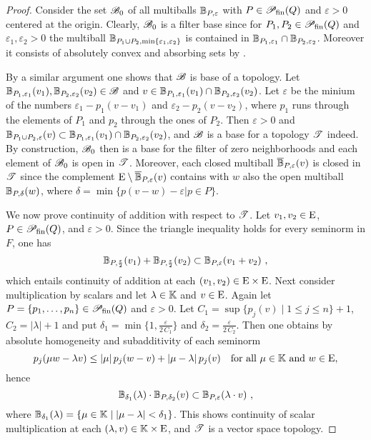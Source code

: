 \begin{proof}
  Consider the set $\mathscr{B}_0$ of all multiballs $\mathbb{B}_{P,\varepsilon}$ with
  $P  \in \mathscr{P}_\textup{fin}(Q)$ and $\varepsilon >0 $ centered at the origin.
  Clearly, $\mathscr{B}_0$ is a filter base since for $P_1,P_2  \in \mathscr{P}_\textup{fin}(Q)$ and
  $\varepsilon_1,\varepsilon_2 >0 $ the multiball
  $\mathbb{B}_{P_1\cup P_2, \min\{ \varepsilon_1,\varepsilon_2\}}$ is contained in
  $\mathbb{B}_{P_1,\varepsilon_1}\cap \mathbb{B}_{P_2,\varepsilon_2}$. Moreover it consists of
  absolutely convex and absorbing sets by .

  By a similar argument one shows that $\mathscr{B}$ is  base of a topology. Let
  $\mathbb{B}_{P_1,\varepsilon_1} (v_1), \mathbb{B}_{P_2,\varepsilon_2} (v_2) \in \mathscr{B}$ and
  $v \in \mathbb{B}_{P_1,\varepsilon_1}(v_1)\cap \mathbb{B}_{P_2,\varepsilon_2}(v_2)$.
  Let $\varepsilon$ be the minium of the numbers $\varepsilon_1 - p_1 (v-v_1)$
  and  $\varepsilon_2 - p_2 (v-v_2)$, where $p_1$ runs through the elements of $P_1$ and
  $p_2$ through the ones of $P_2$. Then $\varepsilon >0$ and
  $\mathbb{B}_{P_1\cup P_2, \varepsilon}(v)
  \subset\mathbb{B}_{P_1,\varepsilon_1}(v_1)\cap\mathbb{B}_{P_2,\varepsilon_2}(v_2)$, and $\mathscr{B}$
  is a base for a topology  $\mathscr{T}$ indeed. By construction,  $\mathscr{B}_0$ then
  is a base for the filter of zero neighborhoods and each element of  $\mathscr{B}_0$ is open in 
  $\mathscr{T}$. Moreover, each closed multiball
  $\overline{\mathbb{B}}_{P,\varepsilon} (v)$ is closed in $\mathscr{T}$ since the complement 
  $\mathrm{E}\setminus \overline{\mathbb{B}}_{P,\varepsilon} (v)$  contains with $w$ also
  the open multiball $\mathbb{B}_{P,\delta} (w)$, where $\delta = \min \{ p(v-w) - \varepsilon| p\in P\}$. 
  
  We now prove continuity of addition with respect to  $\mathscr{T}$. Let $v_1,v_2\in \mathrm{E}$,
  $P \in \mathscr{P}_\textup{fin}(Q)$, and $\varepsilon >0$.
  Since the triangle inequality holds for every seminorm in $F$, one has
  \[
    \mathbb{B}_{P,\frac\varepsilon 2} (v_1) +   \mathbb{B}_{P,\frac\varepsilon 2} (v_2)
    \subset \mathbb{B}_{P,\varepsilon}(v_1+v_2) \ ,
  \]
  which entails continuity of addition at each $(v_1,v_2) \in \mathrm{E} \times \mathrm{E}$.
  Next consider multiplication by scalars and let $\lambda \in \mathbb{K}$ and $v\in \mathrm{E}$. 
  Again let $P= \{ p_1,\ldots, p_n\} \in \mathscr{P}_\textup{fin}(Q)$ and $\varepsilon >0$. 
  Let $C_1 = \sup \{ p_j (v) \mid 1\leq j \leq n\} + 1$, $C_2 = |\lambda| + 1$ 
  and put $\delta_1 = \min \{1,\frac{\varepsilon}{2 \, C_1}  \}$
  and $\delta_2 = \frac{\varepsilon}{2 \, C_2}$.  
  Then one obtains by absolute homogeneity and subadditivity of each seminorm 
  \[
    p_j ( \mu w -\lambda v) \leq | \mu | \, p_j( w-v) + | \mu -\lambda| \, p_j(v) \quad \text{for all }
    \mu \in \mathbb{K}  \text{ and } w \in \mathrm{E}, 
  \]
  hence
  \[
    \mathbb{B}_{\delta_1} (\lambda ) \cdot \mathbb{B}_{P,\delta_2} (v) \subset
    \mathbb{B}_{P,\varepsilon} (\lambda \cdot v ) \ ,
  \]
  where $\mathbb{B}_{\delta_1} (\lambda) = \{ \mu \in \mathbb{K} \mid |\mu -\lambda| < \delta_1\} $.
  This shows continuity of scalar multiplication at each $(\lambda,v) \in \mathbb{K} \times \mathrm{E}$,
  and $\mathscr{T}$ is a vector space topology. 


\end{proof}
